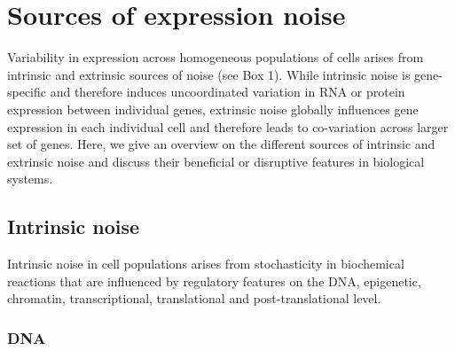 
\section{Sources of expression noise} 

Variability in expression across homogeneous populations of cells arises from intrinsic and extrinsic sources of noise (see Box 1). While intrinsic noise is gene-specific and therefore induces uncoordinated variation in RNA or protein expression between individual genes, extrinsic noise globally influences gene expression in each individual cell and therefore leads to co-variation across larger set of genes. Here, we give an overview on the different sources of intrinsic and extrinsic noise and discuss their beneficial or disruptive features in biological systems.

\subsection{Intrinsic noise}

Intrinsic noise in cell populations arises from stochasticity in biochemical reactions that are influenced by regulatory features on the DNA, epigenetic, chromatin, transcriptional, translational and post-translational level.   

\subsubsection{DNA}

